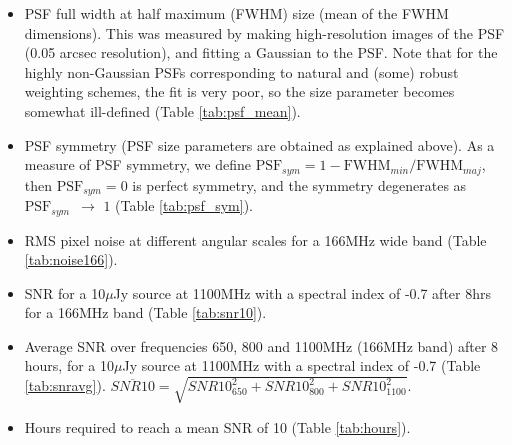 \documentclass[sfheadings,a4paper,times,9pt,floats,floatfix]{article}
\begin{document}
\begin{itemize}
 \item PSF full width at half maximum (FWHM) size (mean of the FWHM dimensions). This was measured by making high-resolution
images of the PSF (0.05 arcsec
resolution), and fitting a Gaussian to the PSF. Note that for the highly non-Gaussian PSFs corresponding to natural and (some)
robust weighting schemes, the fit is very poor, so the size parameter becomes somewhat ill-defined (Table \ref{tab:psf_mean}).

 \item PSF symmetry (PSF size parameters are obtained as explained above). As a measure of PSF symmetry, we define 
$\text{PSF}_{sym}=1-\text{FWHM}_{min}/\text{FWHM}_{maj}$, then $\text{PSF}_{sym} = 0$ is perfect symmetry, and the symmetry
degenerates as $\text{PSF}_{sym}\,\,\, \rightarrow\,\,1$ (Table \ref{tab:psf_sym}).

 \item RMS pixel noise at different angular scales for a 166MHz wide band (Table \ref{tab:noise166}).
 
 \item SNR for a 10$\mu$Jy source at 1100MHz with a spectral index of -0.7 after 8hrs for a 166MHz band (Table \ref{tab:snr10}).
 \item Average SNR over frequencies 650, 800 and 1100MHz (166MHz band)
   after 8 hours, for a 10$\mu$Jy source at 1100MHz
with a spectral index of -0.7 (Table \ref{tab:snravg}). {$\overline{SNR10}=\sqrt{SNR10_{650}^2 + SNR10_{800}^2 +
SNR10_{1100}^2}$}.
 \item Hours required to reach a mean SNR of 10 (Table \ref{tab:hours}).
\end{itemize}
\vspace{-.5cm}
\end{document}
